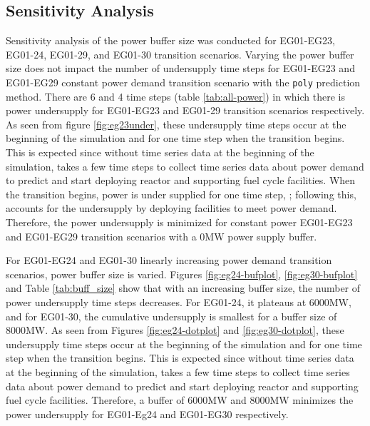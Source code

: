 \subsection{Sensitivity Analysis}
Sensitivity analysis of the power buffer size was conducted for 
EG01-EG23, EG01-24, EG01-29, and EG01-30 transition scenarios. 
Varying the power buffer size does not impact the number of 
undersupply time steps for EG01-EG23 and EG01-EG29 constant 
power demand transition scenario with the \texttt{poly} prediction method.
There are 6 and 4 time steps (table \ref{tab:all-power}) 
in which there is power undersupply for EG01-EG23 and EG01-29 
transition scenarios respectively. 
As seen from figure \ref{fig:eg23under}, these undersupply time 
steps occur at the beginning of the simulation and for one 
time step when the transition begins. 
This is expected since without time series data 
at the beginning of the simulation, \deploy takes a few 
time steps to collect time series data about power demand 
to predict and start deploying reactor and supporting 
fuel cycle facilities. 
When the transition begins, power is under supplied for one 
time step, ; following this, \deploy accounts for the 
undersupply by deploying facilities to meet power demand.
Therefore, the power undersupply is minimized for constant 
power EG01-EG23 and EG01-EG29 transition scenarios with 
a 0MW power supply buffer. 

For EG01-EG24 and EG01-30 linearly increasing power demand 
transition scenarios, power buffer size is varied.  
Figures \ref{fig:eg24-bufplot}, \ref{fig:eg30-bufplot} 
and Table \ref{tab:buff_size} 
show that with an increasing buffer size, the number of 
power undersupply time steps decreases. 
For EG01-24, it plateaus at 6000MW, and for EG01-30, 
the cumulative undersupply is smallest for a buffer 
size of 8000MW.  
As seen from Figures \ref{fig:eg24-dotplot} and 
\ref{fig:eg30-dotplot}, these undersupply time 
steps occur at the beginning of the simulation and for one 
time step when the transition begins. 
This is expected since without time series data 
at the beginning of the simulation, \deploy takes a few 
time steps to collect time series data about power demand 
to predict and start deploying reactor and supporting 
fuel cycle facilities. 
Therefore, a buffer of 6000MW and 8000MW minimizes 
the power undersupply for EG01-Eg24 and EG01-EG30 respectively.

